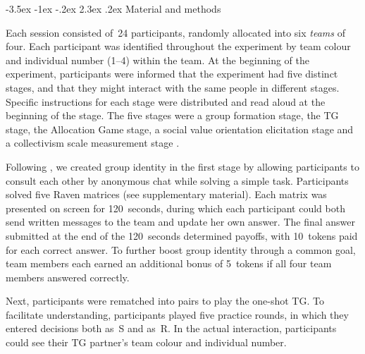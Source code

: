 \documentclass[12pt,a4paper]{article}\usepackage[]{graphicx}\usepackage[]{color}
\makeatletter
\renewcommand\section{\@startsection {section}{1}{\z@}%
{-3.5ex \@plus -1ex \@minus -.2ex}%
{2.3ex \@plus.2ex}%
{\bf\sffamily\Large}}
\makeatother
\begin{document}
\section{Material and methods}
\label{sec:design}

Each session consisted of~24 participants, randomly allocated into six
\emph{teams} of four. Each participant was identified throughout the experiment
by team colour and individual number (1--4) within the team. At the beginning of
the experiment, participants were informed that the experiment had five distinct
stages, and that they might interact with the same people in different stages.
Specific instructions for each stage were distributed and read aloud at the
beginning of the stage. The five stages were a group formation stage, the TG
stage, the Allocation Game stage, a social value orientation elicitation stage
\citep*{murphy2011measuring} and a collectivism scale measurement stage
\citep*[adapted from the horizontal collectivism scale
in][]{Singelis1995horizontal}.

Following \citep{chen2009group}, we created group identity in the
first stage by allowing participants to consult each other by anonymous
chat while solving a simple task. Participants solved five Raven matrices
(see supplementary material). Each matrix was presented on screen
for 120~seconds, during which each participant could both send written
messages to the team and update her own answer. The final answer submitted
at the end of the 120~seconds determined payoffs, with 10~tokens
paid for each correct answer. To further boost group identity through
a common goal, team members each earned an additional bonus of 5~tokens
if all four team members answered correctly.

Next, participants were rematched into pairs to play the one-shot
TG. To facilitate understanding, participants played five practice
rounds, in which they entered decisions both as~S and as~R. In the
actual interaction, participants could see their TG partner's team
colour and individual number. 
\end{document}
